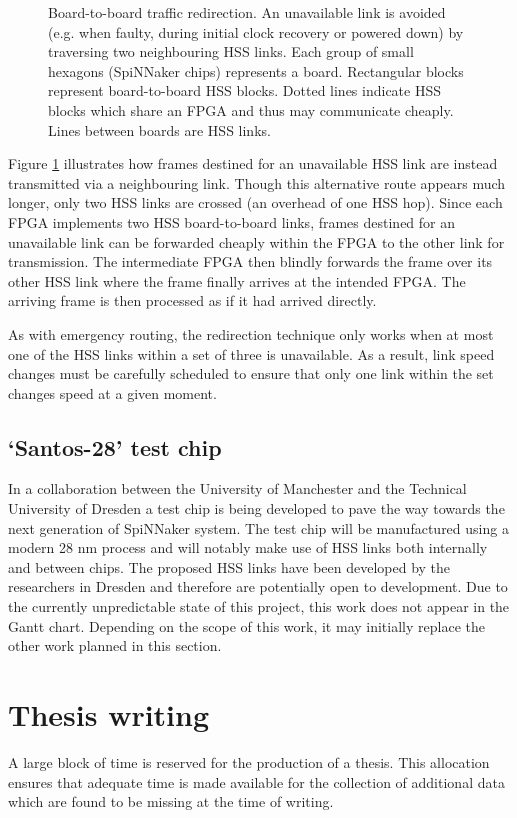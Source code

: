 			\begin{figure}
				\center
				
				
				\caption[Board-to-board traffic redirection.]{Board-to-board traffic
				redirection. An unavailable link is avoided (e.g. when faulty, during
				initial clock recovery or powered down) by traversing two neighbouring
				HSS links. Each group of small hexagons (SpiNNaker chips) represents a
				board. Rectangular blocks represent board-to-board HSS blocks. Dotted
				lines indicate HSS blocks which share an FPGA and thus may communicate
				cheaply. Lines between boards are HSS links.}
				\label{fig:board-to-board-redirection}
			\end{figure}
			
			Figure \ref{fig:board-to-board-redirection} illustrates how frames
			destined for an unavailable HSS link are instead transmitted via a
			neighbouring link.  Though this alternative route appears much longer,
			only two HSS links are crossed (an overhead of one HSS hop). Since each
			FPGA implements two HSS board-to-board links, frames destined for an
			unavailable link can be forwarded cheaply within the FPGA to the other
			link for transmission. The intermediate FPGA then blindly forwards the
			frame over its other HSS link where the frame finally arrives at the
			intended FPGA. The arriving frame is then processed as if it had arrived
			directly.
			
			As with emergency routing, the redirection technique only works when at
			most one of the HSS links within a set of three is unavailable. As a
			result, link speed changes must be carefully scheduled to ensure that only
			one link within the set changes speed at a given moment.
		
		\subsection{`Santos-28' test chip}
			
			
			In a collaboration between the University of Manchester and the Technical
			University of Dresden a test chip is being developed to pave the way
			towards the next generation of SpiNNaker system. The test chip will be
			manufactured using a modern 28 nm process and will notably make use of HSS
			links both internally and between chips. The proposed HSS links have been
			developed by the researchers in Dresden and therefore are potentially open
			to development. Due to the currently unpredictable state of this project,
			this work does not appear in the Gantt chart. Depending on the scope of
			this work, it may initially replace the other work planned in this
			section.
	
	\section{Thesis writing}
		
		A large block of time is reserved for the production of a thesis. This
		allocation ensures that adequate time is made available for the collection
		of additional data which are found to be missing at the time of writing.
